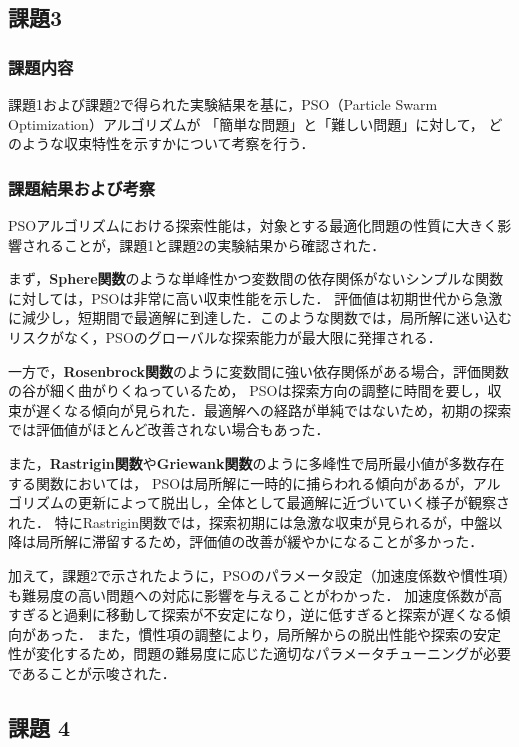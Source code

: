 \subsection{課題3}
\subsubsection{課題内容}
課題1および課題2で得られた実験結果を基に，PSO（Particle Swarm Optimization）アルゴリズムが
「簡単な問題」と「難しい問題」に対して，
どのような収束特性を示すかについて考察を行う．

\subsubsection{課題結果および考察}
PSOアルゴリズムにおける探索性能は，対象とする最適化問題の性質に大きく影響されることが，課題1と課題2の実験結果から確認された．

まず，\textbf{Sphere関数}のような単峰性かつ変数間の依存関係がないシンプルな関数に対しては，PSOは非常に高い収束性能を示した．
評価値は初期世代から急激に減少し，短期間で最適解に到達した．このような関数では，局所解に迷い込むリスクがなく，PSOのグローバルな探索能力が最大限に発揮される．

一方で，\textbf{Rosenbrock関数}のように変数間に強い依存関係がある場合，評価関数の谷が細く曲がりくねっているため，
PSOは探索方向の調整に時間を要し，収束が遅くなる傾向が見られた．最適解への経路が単純ではないため，初期の探索では評価値がほとんど改善されない場合もあった．

また，\textbf{Rastrigin関数}や\textbf{Griewank関数}のように多峰性で局所最小値が多数存在する関数においては，
PSOは局所解に一時的に捕らわれる傾向があるが，アルゴリズムの更新によって脱出し，全体として最適解に近づいていく様子が観察された．
特にRastrigin関数では，探索初期には急激な収束が見られるが，中盤以降は局所解に滞留するため，評価値の改善が緩やかになることが多かった．

加えて，課題2で示されたように，PSOのパラメータ設定（加速度係数や慣性項）も難易度の高い問題への対応に影響を与えることがわかった．
加速度係数が高すぎると過剰に移動して探索が不安定になり，逆に低すぎると探索が遅くなる傾向があった．
また，慣性項の調整により，局所解からの脱出性能や探索の安定性が変化するため，問題の難易度に応じた適切なパラメータチューニングが必要であることが示唆された．



\subsection{課題 4}

